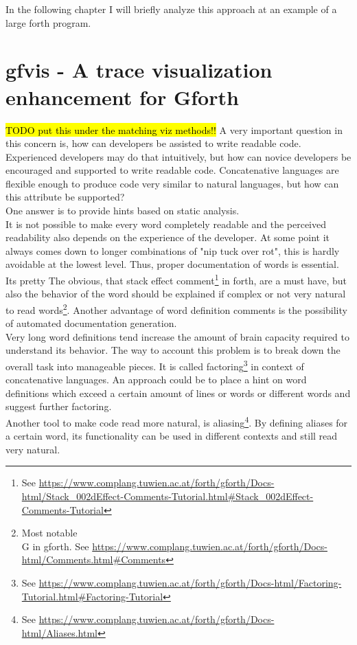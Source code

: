 In the following chapter I will briefly analyze this approach at an example of a large forth program.

\section{gfvis - A trace visualization enhancement for Gforth}


\hl{TODO put this under the matching viz methods!!}
A very important question in this concern is, how can developers be assisted to write readable code. Experienced developers may do that intuitively, but how can novice developers be encouraged and supported to write readable code. Concatenative languages are flexible enough to produce code very similar to natural languages, but how can this attribute be supported?\\
One answer is to provide hints based on static analysis.\\
It is not possible to make every word completely readable and the perceived readability also depends on the experience of the developer. At some point  it always comes down to longer combinations of "nip tuck over rot", this is hardly avoidable at the lowest level. Thus, proper documentation of words is essential. Its pretty The obvious, that stack effect comment\footnote{See \url{https://www.complang.tuwien.ac.at/forth/gforth/Docs-html/Stack\_002dEffect-Comments-Tutorial.html\#Stack\_002dEffect-Comments-Tutorial}} in forth, are a must have, but also the behavior of the word should be explained if complex or not very natural to read words\footnote{Most notable \\G in gforth. See \url{https://www.complang.tuwien.ac.at/forth/gforth/Docs-html/Comments.html\#Comments}}. Another advantage of word definition comments is the possibility of automated documentation generation.\\
Very long word definitions tend increase the amount of brain capacity required to understand its behavior. The way to account this problem is to break down the overall task into manageable pieces. It is called factoring\footnote{See \url{https://www.complang.tuwien.ac.at/forth/gforth/Docs-html/Factoring-Tutorial.html\#Factoring-Tutorial}} in context of concatenative languages. An approach could be to place a hint on word definitions which exceed a certain amount of lines or words or different words and suggest further factoring.\\
Another tool to make code read more natural, is aliasing\footnote{See \url{https://www.complang.tuwien.ac.at/forth/gforth/Docs-html/Aliases.html}}. By defining aliases for a certain word, its functionality can be used in different contexts and still read very natural.
